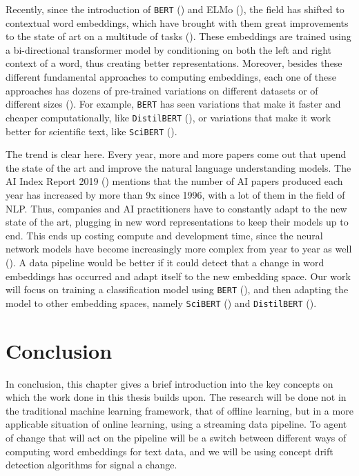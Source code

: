 \documentclass[12pt]{extreport}
\begin{document}
Recently, since the introduction of \texttt{BERT} (\cite{bert}) and ELMo (\cite{elmo}), the field has shifted to contextual word embeddings, which have brought with them great improvements to the state of art on a multitude of tasks (\cite{bert}). These embeddings are trained using a bi-directional transformer model by conditioning on both the left and right context of a word, thus creating better representations. Moreover, besides these different fundamental approaches to computing embeddings, each one of these approaches has dozens of pre-trained variations on different datasets or of different sizes (\cite{huggingface}). For example, \texttt{BERT} has seen variations that make it faster and cheaper computationally, like \texttt{DistilBERT} (\cite{distilbert}), or variations that make it work better for scientific text, like \texttt{SciBERT} (\cite{scibert}).

The trend is clear here. Every year, more and more papers come out that upend the state of the art and improve the natural language understanding models. The AI Index Report 2019 (\cite{aiindex2019}) mentions that the number of AI papers produced each year has increased by more than 9x since 1996, with a lot of them in the field of NLP. Thus, companies and AI practitioners have to constantly adapt to the new state of the art, plugging in new word representations to keep their models up to end. This ends up costing compute and development time, since the neural network models have become increasingly more complex from year to year as well (\cite{aiindex2019}). A data pipeline would be better if it could detect that a change in word embeddings has occurred and adapt itself to the new embedding space. Our work will focus on training a classification model using \texttt{BERT} (\cite{bert}), and then adapting the model to other embedding spaces, namely \texttt{SciBERT} (\cite{scibert}) and \texttt{DistilBERT} (\cite{distilbert}).

\section{Conclusion}

In conclusion, this chapter gives a brief introduction into the key concepts on which the work done in this thesis builds upon. The research will be done not in the traditional machine learning framework, that of offline learning, but in a more applicable situation of online learning, using a streaming data pipeline. To agent of change that will act on the pipeline will be a switch between different ways of computing word embeddings for text data, and we will be using concept drift detection algorithms for signal a change.
\end{document}
